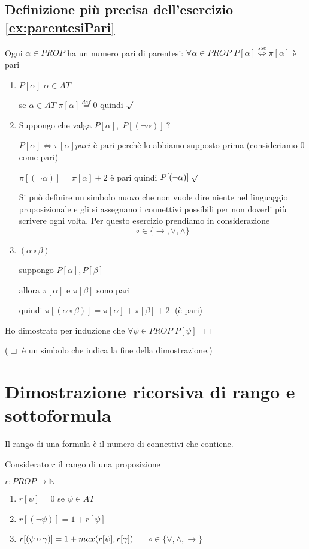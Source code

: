\documentclass{article}
\theoremstyle{break}
\theoremstyle{break}
\theoremstyle{break}
\theoremstyle{break}
\begin{document}
\subsection{Definizione più precisa dell'esercizio \ref{ex:parentesiPari}}
Ogni \( \alpha \in PROP \) ha un numero pari di parentesi: \( \forall \alpha \in PROP \) \( P[\alpha] \stackrel{sse}{\Leftrightarrow} \pi[\alpha] \) è pari
\begin{enumerate}
  \item \( P[\alpha ] \) \( \alpha \in AT \)

    se \( \alpha \in AT \! \) \( \pi[\alpha]\stackrel{def}{=}0 \) quindi \( \surd \)
  \item Suppongo che valga \( P[\alpha ],\; P[(\neg \alpha )] \: ? \)

    \( P[\alpha ] \Leftrightarrow \pi[\alpha ] pari \) è pari perchè lo abbiamo supposto prima (consideriamo 0 come pari)


    \( \pi[(\neg \alpha )] = \pi [\alpha ] + 2 \) è pari quindi \( P[(\neg \alpha )] \; \surd \)

    Si può definire un simbolo nuovo che non vuole dire niente nel linguaggio proposizionale e
    gli si assegnano i connettivi possibili per non doverli più scrivere ogni volta.
    Per questo esercizio prendiamo in considerazione \[ \circ \in \{\to , \vee, \wedge\} \]

  \item \( (\alpha \circ \beta) \)

    suppongo \( P[\alpha ], P[\beta ] \)

    allora \( \pi[\alpha ] \) e \( \pi[\beta ] \) sono pari

    quindi \( \pi[(\alpha \circ \beta )] = \pi[\alpha ] + \pi[\beta ] + 2 \;\) (è pari)

\end{enumerate}

Ho dimostrato per induzione che \( \forall \psi \in PROP \; P[\psi] \; \) \( \Box \)

(\( \Box \) è un simbolo che indica la fine della dimostrazione.)

\section{Dimostrazione ricorsiva di rango e sottoformula}
Il rango di una formula è il numero di connettivi che contiene.
\begin{definition}
  Considerato \( r \) il rango di una proposizione

  \( r: PROP \to \mathbb{N} \)

  \begin{enumerate}
    \item \( r[\psi] = 0 \) se \( \psi \in AT \)
    \item \( r[(\neg \psi)] = 1 + r[\psi] \)
    \item \( r[(\psi \circ \gamma )] = 1 + max(r[\psi], r[\gamma]) \hspace{5mm} \) \( \circ \in \{\vee, \wedge, \to \} \)

  \end{enumerate}
\end{definition}
\end{document}
